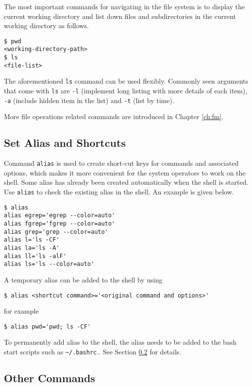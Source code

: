 The most important commands for navigating in the file system is to display the current working directory and list down files and subdirectories in the current working directory as follows.
\begin{lstlisting}
$ pwd
<working-directory-path>
$ ls
<file-list>
\end{lstlisting}

The aforementioned \verb|ls| command can be used flexibly. Commonly seen arguments that come with \verb|ls| are \verb|-l| (implement long listing with more details of each item), \verb|-a| (include hidden item in the list) and \verb|-t| (list by time).

More file operations related commands are introduced in Chapter \ref{ch:fm}.

\subsection{Set Alias and Shortcuts}

Command \verb|alias| is used to create short-cut keys for commands and associated options, which makes it more convenient for the system operators to work on the shell. Some alias has already been created automatically when the shell is started. Use \verb|alias| to check the existing alias in the shell. An example is given below.

\begin{lstlisting}
$ alias
alias egrep='egrep --color=auto'
alias fgrep='fgrep --color=auto'
alias grep='grep --color=auto'
alias l='ls -CF'
alias la='ls -A'
alias ll='ls -alF'
alias ls='ls --color=auto'
\end{lstlisting}

A temporary alias can be added to the shell by using
\begin{lstlisting}
$ alias <shortcut command>='<original command and options>'
\end{lstlisting}
for example
\begin{lstlisting}
$ alias pwd='pwd; ls -CF'
\end{lstlisting}

To permanently add alias to the shell, the alias needs to be added to the bash start scripts such as \verb|~/.bashrc|.. See Section \ref{ch:sb:subsec:others} for details.

\subsection{Other Commands}\label{ch:sb:subsec:others}

